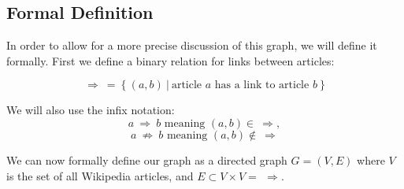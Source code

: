 \subsection{Formal Definition}
In order to allow for a more precise discussion of this graph, we will define it formally. First we define a binary relation for links between articles:

$$\Rightarrow\ =\ \{\ (a,b)\ |\ \text{article } a \text{ has a link to article } b\ \}$$

We will also use the infix notation:
$$a\ \Rightarrow\ b \text{ meaning } (a,b) \in\ \Rightarrow,$$ 
$$a\ \not\Rightarrow\ b \text{ meaning } (a,b) \not\in\ \Rightarrow$$

We can now formally define our graph as a directed graph $G = (V,E)$ where $V$ is the set of all Wikipedia articles, and $E\subset V \times V = \ \, \Rightarrow$.